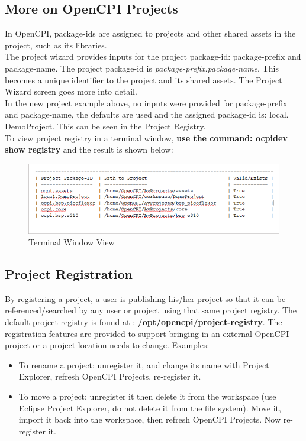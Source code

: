 \documentclass[10pt, a4paper, oneside]{article}
\begin{document}
\subsection{More on OpenCPI Projects}
In OpenCPI, package-ids are assigned to projects and other shared assets in the project, such as its libraries.\\
 The project wizard provides inputs for the project package-id: package-prefix and package-name. The project package-id is \emph{package-prefix.package-name}. This becomes a unique identifier to the project and its shared assets. The Project Wizard screen goes more into detail.\\

In the new project example above, no inputs were provided for package-prefix and package-name, the defaults are used and the assigned package-id is: local. DemoProject. This can be seen in the Project Registry.\\ To view project registry in a terminal window, \textbf{use the command: ocpidev show registry} and the result is shown below:
\begin{figure}[h!]
	\centering
	\caption{Terminal Window View}\label{fig:TerminalWindowView}
	\includegraphics[width=.75\textwidth]{TerminalWindowView.png}
 \end{figure}
\subsection{Project Registration}
By registering a project, a user is publishing his/her project so that it can be referenced/searched by any user or project using that same project registry. The default project registry is found at : \textbf{ /opt/opencpi/project-registry}. The registration features are provided to support bringing in an external OpenCPI project or a project location needs to change.
Examples:
\begin{itemize}
\item	To rename a project: unregister it, and change its name with Project Explorer, refresh OpenCPI Projects, re-register it.
\item	To move a project: unregister it then delete it from the workspace (use Eclipse Project Explorer, do not delete it from the file system). Move it, import it back into the workspace, then refresh OpenCPI Projects. Now re-register it.
\end{itemize}
\end{document}
